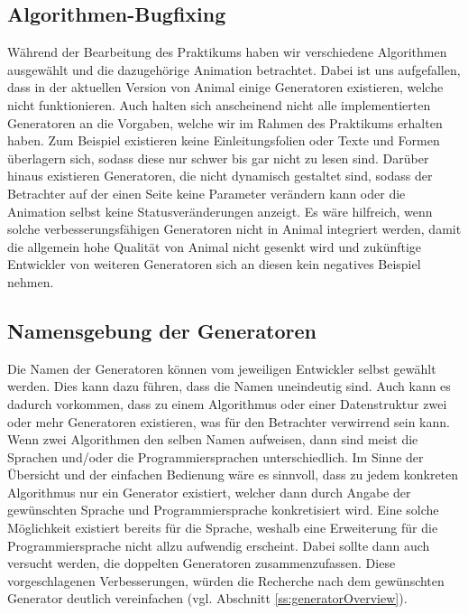 \documentclass[nochapname]{tudexercise}
\begin{document}
		\subsection{Algorithmen-Bugfixing}
			Während der Bearbeitung des Praktikums haben wir verschiedene Algorithmen ausgewählt und die dazugehörige Animation betrachtet. Dabei ist uns aufgefallen, dass in der aktuellen Version von Animal einige Generatoren existieren, welche nicht funktionieren. Auch halten sich anscheinend nicht alle implementierten Generatoren an die Vorgaben, welche wir im Rahmen des Praktikums erhalten haben. Zum Beispiel existieren keine Einleitungsfolien oder Texte und Formen überlagern sich, sodass diese nur schwer bis gar nicht zu lesen sind. Darüber hinaus existieren Generatoren, die nicht dynamisch gestaltet sind, sodass der Betrachter auf der einen Seite keine Parameter verändern kann oder die Animation selbst keine Statusveränderungen anzeigt. Es wäre hilfreich, wenn solche verbesserungsfähigen Generatoren nicht in Animal integriert werden, damit die allgemein hohe Qualität von Animal nicht gesenkt wird und zukünftige Entwickler von weiteren Generatoren sich an diesen kein negatives Beispiel nehmen.
			
		\subsection{Namensgebung der Generatoren}
			Die Namen der Generatoren können vom jeweiligen Entwickler selbst gewählt werden. Dies kann dazu führen, dass die Namen uneindeutig sind. Auch kann es dadurch vorkommen, dass zu einem Algorithmus oder einer Datenstruktur zwei oder mehr Generatoren existieren, was für den Betrachter verwirrend sein kann. Wenn zwei Algorithmen den selben Namen aufweisen, dann sind meist die Sprachen und/oder die Programmiersprachen unterschiedlich. Im Sinne der Übersicht und der einfachen Bedienung wäre es sinnvoll, dass zu jedem konkreten Algorithmus nur ein Generator existiert, welcher dann durch Angabe der gewünschten Sprache und Programmiersprache konkretisiert wird. Eine solche Möglichkeit existiert bereits für die Sprache, weshalb eine Erweiterung für die Programmiersprache nicht allzu aufwendig erscheint. Dabei sollte dann auch versucht werden, die doppelten Generatoren zusammenzufassen. Diese vorgeschlagenen Verbesserungen, würden die Recherche nach dem gewünschten Generator deutlich vereinfachen (vgl. Abschnitt \ref{ss:generatorOverview}).
			
\end{document}
